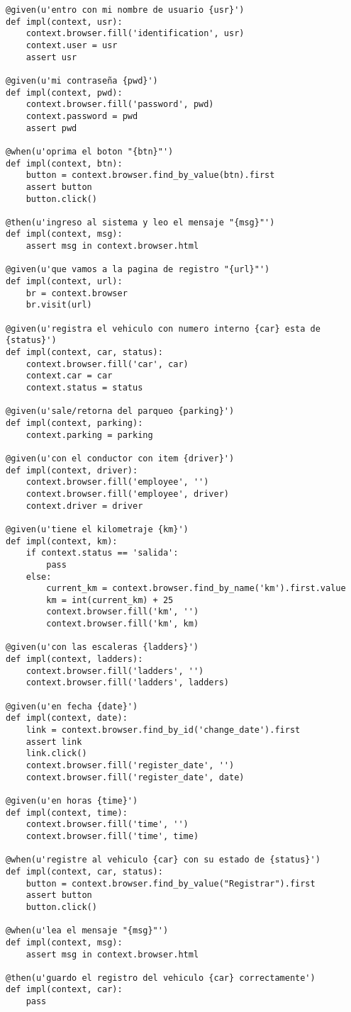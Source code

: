 {\begin{verbatim}
@given(u'entro con mi nombre de usuario {usr}')
def impl(context, usr):
    context.browser.fill('identification', usr)
    context.user = usr
    assert usr

@given(u'mi contraseña {pwd}')
def impl(context, pwd):
    context.browser.fill('password', pwd)
    context.password = pwd
    assert pwd

@when(u'oprima el boton "{btn}"')
def impl(context, btn):
    button = context.browser.find_by_value(btn).first
    assert button
    button.click()

@then(u'ingreso al sistema y leo el mensaje "{msg}"')
def impl(context, msg):
    assert msg in context.browser.html

@given(u'que vamos a la pagina de registro "{url}"')
def impl(context, url):
    br = context.browser
    br.visit(url)

@given(u'registra el vehiculo con numero interno {car} esta de {status}')
def impl(context, car, status):
    context.browser.fill('car', car)
    context.car = car
    context.status = status

@given(u'sale/retorna del parqueo {parking}')
def impl(context, parking):
    context.parking = parking

@given(u'con el conductor con item {driver}')
def impl(context, driver):
    context.browser.fill('employee', '')
    context.browser.fill('employee', driver)
    context.driver = driver

@given(u'tiene el kilometraje {km}')
def impl(context, km):
    if context.status == 'salida':
        pass
    else:
        current_km = context.browser.find_by_name('km').first.value
        km = int(current_km) + 25
        context.browser.fill('km', '')
        context.browser.fill('km', km)

@given(u'con las escaleras {ladders}')
def impl(context, ladders):
    context.browser.fill('ladders', '')
    context.browser.fill('ladders', ladders)

@given(u'en fecha {date}')
def impl(context, date):
    link = context.browser.find_by_id('change_date').first
    assert link
    link.click()
    context.browser.fill('register_date', '')
    context.browser.fill('register_date', date)

@given(u'en horas {time}')
def impl(context, time):
    context.browser.fill('time', '')
    context.browser.fill('time', time)

@when(u'registre al vehiculo {car} con su estado de {status}')
def impl(context, car, status):
    button = context.browser.find_by_value("Registrar").first
    assert button
    button.click()

@when(u'lea el mensaje "{msg}"')
def impl(context, msg):
    assert msg in context.browser.html

@then(u'guardo el registro del vehiculo {car} correctamente')
def impl(context, car):
    pass

  \end{verbatim}
}

